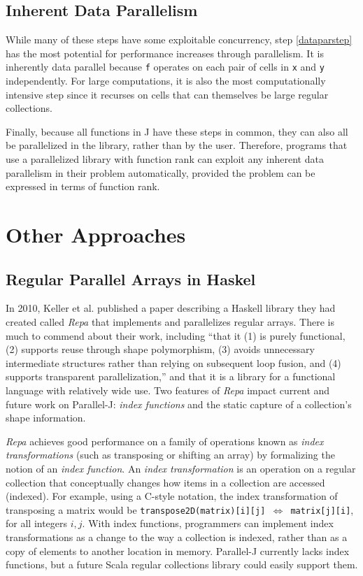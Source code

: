 \subsection{Inherent Data Parallelism}

While many of these steps have some exploitable concurrency, 
step \ref{dataparstep} has the most potential for performance increases through parallelism.
It is inherently data parallel because 
\texttt{f} operates on each pair of cells in \texttt{x} and \texttt{y} independently.
For large computations, it is also the most computationally intensive step
since it recurses on cells that can themselves be large regular collections.

Finally, because all functions in J have these steps in common, 
they can also all be parallelized in the library, rather than by the user.
Therefore, programs that use a parallelized library with function rank 
can exploit any inherent data parallelism in their problem automatically, 
provided the problem can be expressed in terms of function rank.

\section{Other Approaches}
\subsection{Regular Parallel Arrays in Haskel}
\label{repa}
In 2010, Keller et al. published a paper 
describing a Haskell library they had created called \textit{Repa}\cite{dph}
that implements and parallelizes regular arrays.
There is much to commend about their work, including ``that it (1) is purely
functional, (2) supports reuse through shape polymorphism, (3)
avoids unnecessary intermediate structures rather than relying on
subsequent loop fusion, and (4) supports transparent parallelization,''
and that it is a library for a functional language with relatively wide use. 
Two features of \textit{Repa} impact current and future work on Parallel-J: 
\textit{index functions} and the static capture of a collection's shape information.

\textit{Repa} achieves good performance on a family of operations known as \textit{index transformations} 
(such as transposing or shifting an array) 
by formalizing the notion of an \textit{index function}.
An \textit{index transformation} is an operation on a regular collection that 
conceptually changes how items in a collection are accessed (indexed). 
For example, using a C-style notation, 
the index transformation of transposing a matrix would be
\texttt{transpose2D(matrix)[i][j] $\Leftrightarrow$ matrix[j][i]}, for all integers $i,j$. 
With index functions, programmers can implement index transformations as 
a change to the way a collection is indexed, 
rather than as a copy of elements to another location in memory.
Parallel-J currently lacks index functions, 
but a future Scala regular collections library could easily support them.

